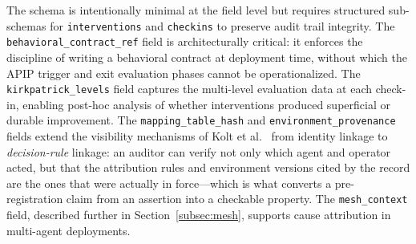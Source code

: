 The schema is intentionally minimal at the field level but requires structured
sub-schemas for \texttt{interventions} and \texttt{checkins} to preserve audit
trail integrity. The \texttt{behavioral\_contract\_ref} field is
architecturally critical: it enforces the discipline of writing a behavioral
contract at deployment time, without which the APIP trigger and exit evaluation
phases cannot be operationalized. The \texttt{kirkpatrick\_levels} field
captures the multi-level evaluation data at each check-in, enabling post-hoc
analysis of whether interventions produced superficial or durable improvement.
The \texttt{mapping\_table\_hash} and \texttt{environment\_provenance} fields
extend the visibility mechanisms of Kolt et al.~\cite{kolt2024visibility} from
identity linkage to \emph{decision-rule} linkage: an auditor can verify not
only which agent and operator acted, but that the attribution rules and
environment versions cited by the record are the ones that were actually in
force---which is what converts a pre-registration claim from an assertion into
a checkable property.
The \texttt{mesh\_context} field, described further in
Section~\ref{subsec:mesh}, supports cause attribution in multi-agent
deployments.
